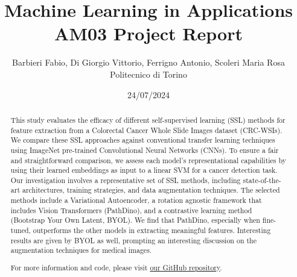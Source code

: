 \documentclass[peerreview]{IEEEtran}
\begin{document}
\title{Machine Learning in Applications \\ AM03 Project Report}


\author{Barbieri Fabio, Di Giorgio Vittorio, Ferrigno Antonio, Scoleri Maria Rosa\\
Politecnico di Torino\\
}
\date{24/07/2024}

\maketitle
\tableofcontents
\newpage
\listoffigures
\listoftables

\IEEEpeerreviewmaketitle
\begin{abstract}
This study evaluates the efficacy of different self-supervised learning (SSL) methods for feature extraction from a Colorectal Cancer Whole Slide Images dataset (CRC-WSIs). We compare these SSL approaches against conventional transfer learning techniques using ImageNet pre-trained Convolutional Neural Networks (CNNs). To ensure a fair and straightforward comparison, we assess each model's representational capabilities by using their learned embeddings as input to a linear SVM for a cancer detection task. Our investigation involves a representative set of SSL methods, including state-of-the-art architectures, training strategies, and data augmentation techniques. The selected methods include a Variational Autoencoder, a rotation agnostic framework that includes Vision Transformers (PathDino), and a contrastive learning method (Bootstrap Your Own Latent, BYOL). 
We find that PathDino, especially when fine-tuned, outperforms the other models in extracting meaningful features. Interesting results are given by BYOL as well, prompting an interesting discussion on the augmentation techniques for medical images.

\vspace{0.2cm} 
\noindent For more information and code, please visit  \href{https://github.com/s316467/ML-in-Apps-2024-AM03-Extracting-Features-from-Medical-Images}{our GitHub repository}.
\end{abstract}
\end{document}
